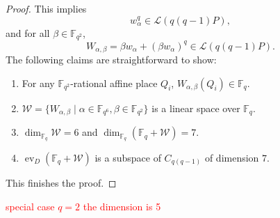 \documentclass[11pt]{amsart}
\theoremstyle{plain}
\theoremstyle{definition}
\theoremstyle{remark}
\DeclareMathOperator{\ev}{ev}
\begin{document}
\begin{proof}
	This implies
	\[w_\alpha^q\in \mathscr{L}(q(q-1)P),\]
	and for all $\beta \in \mathbb{F}_{q^2}$, 
	\[W_{\alpha,\beta}=\beta w_\alpha +(\beta w_\alpha)^q\in \mathscr{L}(q(q-1)P).\]
	The following claims are straightforward to show:
	\begin{enumerate}
		\item For any $\mathbb{F}_{q^2}$-rational affine place $Q_i$, $W_{\alpha,\beta}(Q_i)\in \mathbb{F}_q$.
		\item $\mathcal{W}=\{W_{\alpha,\beta} \mid \alpha \in \mathbb{F}_{q^6}, \beta \in \mathbb{F}_{q^2}\}$ is a linear space over $\mathbb{F}_q$.
		\item $\dim_{\mathbb{F}_q}\mathcal{W}=6$ and $\dim_{\mathbb{F}_q}(\mathbb{F}_q+ \mathcal{W})=7$.
		\item $\ev_D(\mathbb{F}_q+ \mathcal{W})$ is a subspace of $C_{q(q-1)}$ of dimension $7$.
	\end{enumerate}
	This finishes the proof.
	
	
\end{proof}


\textcolor{red}{special case $q=2$ the dimension is 5 }






\end{document}

